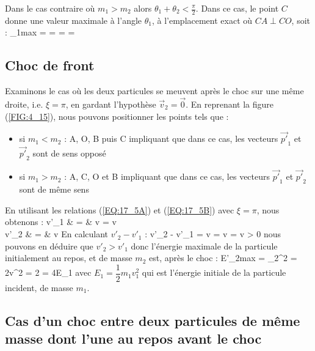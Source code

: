 Dans le cas contraire o\`u $m_{1} > m_{2}$ alors $\theta_{1} + \theta_{2} < \frac{\pi}{2}$. Dans ce cas, le point $C$ donne une valeur maximale \`a l'angle $\theta_{1}$, \`a l'emplacement exact o\`u $CA \perp CO$, soit :
\be
	\sin\theta_{1max} =  =  =  =  \label{EQ:17_8}
\ee

\subsection{Choc de front}

Examinons le cas o\`u les deux particules se meuvent apr\`es le choc sur une m\^eme droite, i.e. $\xi = \pi$, en gardant l'hypoth\`ese $\vec{v}_{2} = \vec{0}$. En reprenant la figure (\ref{FIG:4_15}), nous pouvons positionner les points tels que :
\begin{itemize}
	\item si $m_{1} < m_{2}$ : A, O, B puis C impliquant que dans ce cas, les vecteurs $\vec{p'}_{1}$ et $\vec{p'}_{2}$ sont de sens oppos\'e
	\item si $m_{1} > m_{2}$ : A, C, O et B impliquant que dans ce cas, les vecteurs $\vec{p'}_{1}$ et $\vec{p'}_{2}$ sont de m\^eme sens
\end{itemize}
En utilisant les relations (\ref{EQ:17_5A}) et (\ref{EQ:17_5B}) avec $\xi = \pi$, nous obtenons :
\bea
	v'_{1} & = & v = v \nonumber \\
	v'_{2} & = & v \label{EQ:17_6}
\eea
En calculant $v'_{2} - v'_{1}$ :
\benn
	v'_{2} - v'_{1} = v = v = v > 0
\eenn
nous pouvons en d\'eduire que $v'_{2} > v'_{1}$ donc l'\'energie maximale de la particule initialement au repos, et de masse $m_{2}$ est, apr\`es le choc :
\benn
	E'_{2max} = _{2}^{2} = 2v^{2} = 2 = 4E_{1} \label{EQ:17_7}
\eenn
avec $E_{1} = \dfrac{1}{2}m_{1}v_{1}^{2}$ qui est l'\'energie initiale de la particule incident, de masse $m_{1}$.

\subsection{Cas d'un choc entre deux particules de même masse dont l'une au repos avant le choc}

